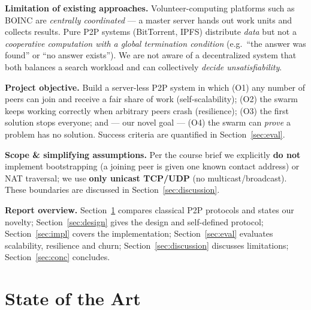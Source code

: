 \documentclass[11pt,a4paper]{article}
\begin{document}
\textbf{Limitation of existing approaches.} Volunteer-computing platforms such as BOINC are
\emph{centrally coordinated} --- a master server hands out work units and collects results.
Pure P2P systems (BitTorrent, IPFS) distribute \emph{data} but not a \emph{cooperative
computation with a global termination condition} (e.g.\ ``the answer was found'' or ``no answer
exists''). We are not aware of a decentralized system that both balances a search workload and
can collectively \emph{decide unsatisfiability}.

\textbf{Project objective.} Build a server-less P2P system in which (O1) any number of peers can
join and receive a fair share of work (self-scalability); (O2) the swarm keeps working
correctly when arbitrary peers crash (resilience); (O3) the first solution stops everyone; and
--- our novel goal --- (O4) the swarm can \emph{prove} a problem has no solution. Success
criteria are quantified in Section~\ref{sec:eval}.

\textbf{Scope \& simplifying assumptions.} Per the course brief we explicitly \textbf{do not}
implement bootstrapping (a joining peer is given one known contact address) or NAT traversal;
we use \textbf{only unicast TCP/UDP} (no multicast/broadcast). These boundaries are discussed
in Section~\ref{sec:discussion}.

\textbf{Report overview.} Section~\ref{sec:sota} compares classical P2P protocols and states our
novelty; Section~\ref{sec:design} gives the design and self-defined protocol;
Section~\ref{sec:impl} covers the implementation; Section~\ref{sec:eval} evaluates scalability,
resilience and churn; Section~\ref{sec:discussion} discusses limitations; Section~\ref{sec:conc}
concludes.

\section{State of the Art}\label{sec:sota}
\end{document}
